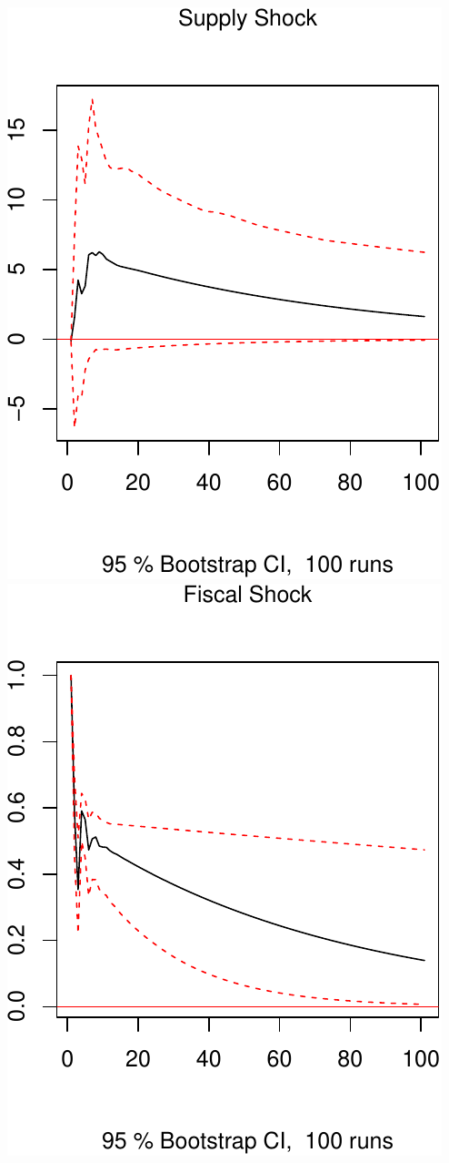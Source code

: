 \documentclass[11pt,preprint, authoryear]{elsarticle}
\numberwithin{equation}{section}
\numberwithin{figure}{section}
\numberwithin{table}{section}
\begin{document}
\includegraphics{TS_proj_files/figure-latex/unnamed-chunk-41-1.pdf}
\includegraphics{TS_proj_files/figure-latex/unnamed-chunk-41-2.pdf}
\end{document}
